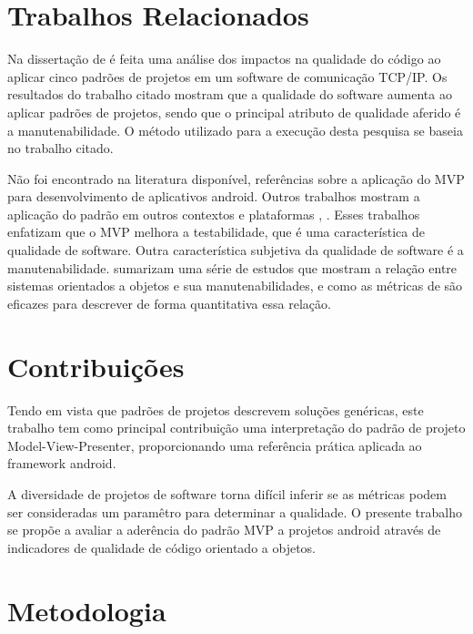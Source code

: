 \section{Trabalhos Relacionados}

Na dissertação de  é feita uma análise dos impactos na
qualidade do código  ao aplicar cinco padrões de projetos em um software de comunicação
TCP/IP. Os resultados do trabalho citado mostram que a qualidade do software
aumenta ao aplicar padrões de projetos, sendo que o principal atributo de
qualidade aferido é a manutenabilidade. O método utilizado para a execução desta
pesquisa se baseia no trabalho citado. 

Não foi encontrado na literatura disponível, referências sobre a aplicação do
MVP para desenvolvimento de aplicativos android. Outros trabalhos mostram a
aplicação do padrão em outros contextos e plataformas  \cite{presenterfirst},
\cite{yangmvp}. Esses trabalhos enfatizam que o MVP melhora a
testabilidade, que é uma característica de qualidade de software. Outra
característica subjetiva da qualidade de software é a manutenabilidade.
 sumarizam uma série de estudos que mostram a relação
entre sistemas orientados a objetos e sua manutenabilidades, e como as métricas
de  são eficazes para descrever de forma quantitativa essa
relação. 

\section{Contribuições}


Tendo em vista que padrões de projetos descrevem soluções genéricas, este
trabalho tem como principal contribuição uma interpretação do padrão de projeto
Model-View-Presenter, proporcionando uma referência prática aplicada ao
framework android.

A diversidade de projetos de software torna difícil inferir se as métricas
podem ser consideradas um paramêtro para determinar a qualidade. O presente
trabalho  se propõe a avaliar a aderência do padrão MVP a projetos android
através de indicadores de qualidade de código orientado a objetos.

\section{Metodologia}

